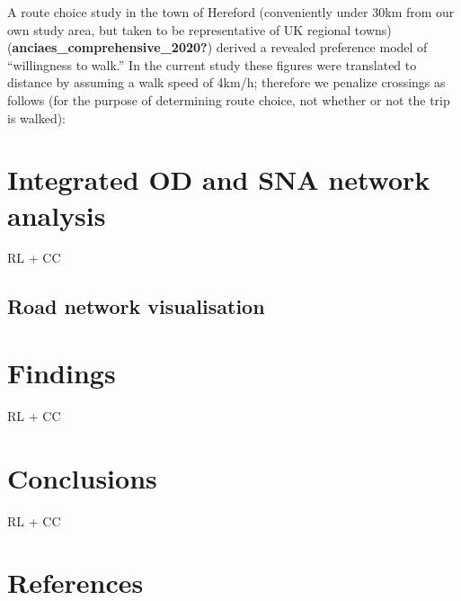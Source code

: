 \documentclass[galley]{jtlu-article-2col}
\begin{document}
A route choice study in the town of Hereford (conveniently under 30km from our own study area, but taken to be representative of UK regional towns) (\textbf{anciaes\_comprehensive\_2020?}) derived a revealed preference model of ``willingness to walk.''
In the current study these figures were translated to distance by assuming a walk speed of 4km/h; therefore we penalize crossings as follows (for the purpose of determining route choice, not whether or not the trip is walked):

\hypertarget{integrated-od-and-sna-network-analysis}{%
\section{Integrated OD and SNA network analysis}\label{integrated-od-and-sna-network-analysis}}

RL + CC

\hypertarget{road-network-visualisation}{%
\subsection{Road network visualisation}\label{road-network-visualisation}}

\hypertarget{findings}{%
\section{Findings}\label{findings}}

RL + CC

\hypertarget{conclusions}{%
\section{Conclusions}\label{conclusions}}

RL + CC

\hypertarget{references}{%
\section*{References}\label{references}}
\end{document}
